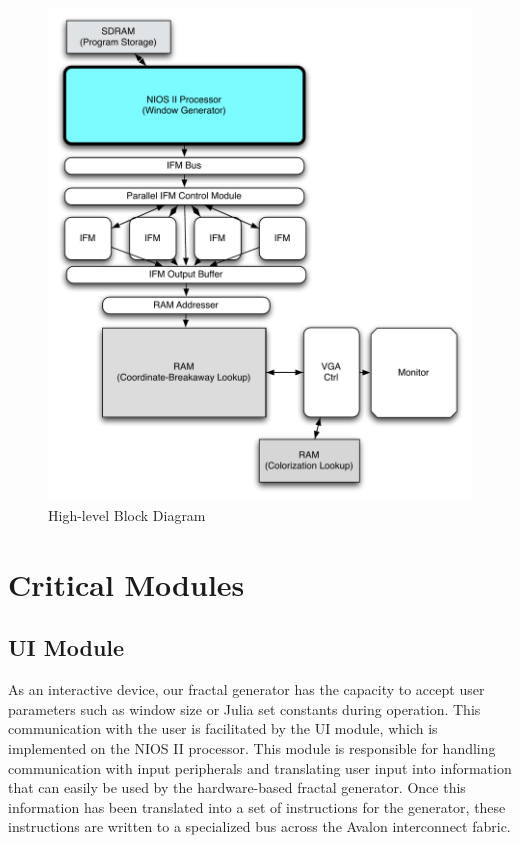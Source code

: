 \documentclass{article}
\begin{document}
\begin{figure}[H]
  \centering
	\includegraphics[width=\textwidth]{block_diagrams/top_level.pdf}
  \caption{High-level Block Diagram}
\end{figure}
\newpage

\section{Critical Modules}

\subsection{UI Module}

As an interactive device, our fractal generator has the capacity to
accept user parameters such as window size or Julia set constants
during operation. This communication with the user is facilitated by
the UI module, which is implemented on the NIOS II processor. This
module is responsible for handling communication with input
peripherals and translating user input into information that can
easily be used by the hardware-based fractal generator. Once this
information has been translated into a set of instructions for the
generator, these instructions are written to a specialized bus across
the Avalon interconnect fabric.
\end{document}
